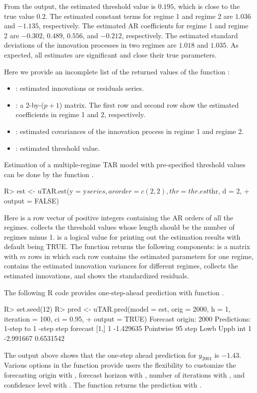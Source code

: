 From the output, the estimated threshold value is $0.195$, which is close to the true value $0.2$. The estimated constant terms for regime 1 and regime 2 are $1.036$ and $-1.135$, respectively.
The estimated AR coefficients for regime 1 and regime 2 are $-0.302$, $0.489$, $0.556$, and $-0.212$,
respectively.  The estimated standard deviations of the innovation processes in two regimes
are $1.018$ and $1.035$. As expected, all estimates are significant and close their true parameters.


Here we provide an incomplete list of the returned values of the function :
\begin{itemize}\setlength\itemsep{-0.3em}
\item {}: estimated innovations or residuals series.
\item {}: a 2-by-($p+1$) matrix. The first row and second row show the estimated
coefficients in regime 1 and 2, respectively.
\item {}: estimated covariances of the innovation process in regime 1 and regime 2.
\item {}: estimated threshold value.
\end{itemize}




Estimation of a multiple-regime TAR model with pre-specified threshold values  can be done by the
function . 
\begin{example}
R> est <- uTAR.est(y = y$series, arorder = c(2, 2), thr = thr.est$thr, d = 2, 
+    output = FALSE)
\end{example}
Here  is a row vector of positive integers containing the AR orders of all the regimes.  collects the threshold values whose length should be the number of regimes minus 1.  is a logical value for printing out the estimation results with default being TRUE. The function  returns the following components:  is a matrix with $m$ rows in which each row contains the estimated parameters for one regime,  contains the estimated innovation variances for different regimes,  collects the estimated innovations, and  shows the standardized residuals.



The following {R} code provides one-step-ahead prediction with function .
\begin{example}
R> set.seed(12)
R> pred <- uTAR.pred(model = est, orig = 2000, h = 1, iteration = 100, ci = 0.95,
+    output = TRUE)
Forecast origin:  2000 
Predictions: 1-step to  1 -step 
     step  forecast
[1,]    1 -1.429635
Pointwise  95  %
    step      Lowb      Uppb
int    1 -2.991667 0.6531542
\end{example}
The output above shows that the one-step ahead prediction for $y_{2001}$ is $-1.43$. Various options in the function  provide users the flexibility to customize the forecasting origin with , forecast horizon with , number of iterations with , and confidence level with . The function  returns the prediction with . 


